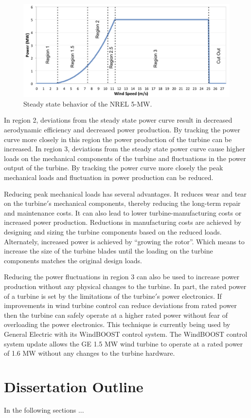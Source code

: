 \begin{figure}[htbp]
	\centering
		\includegraphics[width=\linewidth]{Figures/ch1Figures/fig1-6.png}
	\caption{Steady state behavior of the NREL 5-MW.\cite{jonkman2009}}
	\label{fig1-6}
\end{figure}

In region 2, deviations from the steady state power curve result in decreased aerodynamic efficiency and decreased power production.  By tracking the power curve more closely in this region the power production of the turbine can be increased.  In region 3, deviations from the steady state power curve cause higher loads on the mechanical components of the turbine and fluctuations in the power output of the turbine.  By tracking the power curve more closely the peak mechanical loads and fluctuation in power production can be reduced.

Reducing peak mechanical loads has several advantages.  It reduces wear and tear on the turbine$'$s mechanical components, thereby reducing the long-term repair and maintenance costs.  It can also lead to lower turbine-manufacturing costs or increased power production.  Reductions in manufacturing costs are achieved by designing and sizing the turbine components based on the reduced loads.  Alternately, increased power is achieved by “growing the rotor”.  Which means to increase the size of the turbine blades until the loading on the turbine components matches the original design loads.

Reducing the power fluctuations in region 3 can also be used to increase power production without any physical changes to the turbine.  In part, the rated power of a turbine is set by the limitations of the turbine$'$s power electronics.  If improvements in wind turbine control can reduce deviations from rated power then the turbine can safely operate at a higher rated power without fear of overloading the power electronics.  This technique is currently being used by General Electric with its WindBOOST control system. The WindBOOST control system update allows the GE 1.5 MW wind turbine to operate at a rated power of 1.6 MW without any changes to the turbine hardware. \cite{GE2009}




\section{Dissertation Outline}

In the following sections ...